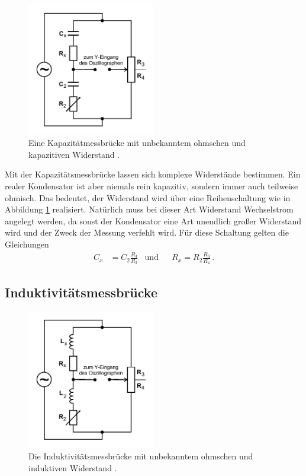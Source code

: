 \begin{figure}
    \centering
    \includegraphics[width=0.5\textwidth]{pictures/schaltung3.pdf}
    \caption{Eine Kapazitätmessbrücke mit unbekanntem ohmschen und kapazitiven Widerstand \cite[5]{v302}.}
    \label{fig:Schaltung3}
\end{figure}

Mit der Kapazitätsmessbrücke lassen sich komplexe Widerstände bestimmen. 
Ein realer Kondensator ist aber niemals rein kapazitiv, sondern immer auch teilweise ohmisch.
Das bedeutet, der Widerstand wird über eine Reihenschaltung wie in Abbildung \ref{fig:Schaltung3} realisiert.
Natürlich muss bei dieser Art Widerstand Wechselstrom angelegt werden, da sonst der Kondensator eine Art 
unendlich großer Widerstand wird und der Zweck der Messung verfehlt wird.
Für diese Schaltung gelten die Gleichungen
\begin{align}
    C_x &= C_2 \frac {R_4}{R_3} & \text{und} & &   R_x = R_2 \frac {R_3}{R_4} \, .
\end{align}

\subsection{Induktivitätsmessbrücke}

\begin{figure}
    \centering
    \includegraphics[width=0.5\textwidth]{pictures/schaltung4.pdf}
    \caption{Die Induktivitätsmessbrücke mit unbekanntem ohmschen und induktiven Widerstand \cite[6]{v302}.}
    \label{fig:Schaltung4}
\end{figure}

